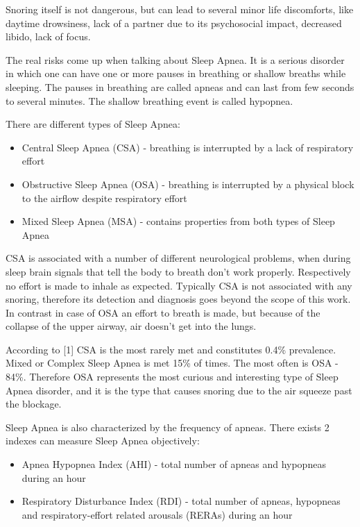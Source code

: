 \documentclass[12pt,a4paper]{report}
\begin{document}
Snoring itself is not dangerous, but can lead to several minor life discomforts, like daytime drowsiness, lack of a partner due to its psychosocial impact, decreased libido, lack of focus.

The real risks come up when talking about Sleep Apnea. It is a serious disorder in which one can have one or more pauses in breathing or shallow breaths while sleeping. The pauses in breathing are called apneas and can last from few seconds to several minutes. The shallow breathing event is called hypopnea. 

There are different types of Sleep Apnea:
\begin{itemize}
 \item Central Sleep Apnea (CSA) - breathing is interrupted by a lack of respiratory effort
 \item Obstructive Sleep Apnea (OSA) - breathing is interrupted by a physical block to the airflow despite respiratory effort
 \item Mixed Sleep Apnea (MSA) - contains properties from both types of Sleep Apnea
\end{itemize}

CSA is associated with a number of different neurological problems, when during sleep brain signals that tell the body to breath don't work properly. Respectively no effort is made to inhale as expected. Typically CSA is not associated with any snoring, therefore its detection and diagnosis goes beyond the scope of this work. In contrast in case of OSA an effort to breath is made, but because of the collapse of the upper airway, air doesn't get into the lungs.

According to [1] CSA is the most rarely met and constitutes 0.4\% prevalence. Mixed or Complex Sleep Apnea is met 15\% of times. The most often is OSA - 84\%. Therefore OSA represents the most curious and interesting type of Sleep Apnea disorder, and it is the type that causes snoring due to the air squeeze past the blockage. 

Sleep Apnea is also characterized by the frequency of apneas. There exists 2 indexes can measure Sleep Apnea objectively: 
\begin{itemize}
 \item Apnea Hypopnea Index (AHI) - total number of apneas and hypopneas during an hour
 \item Respiratory Disturbance Index (RDI) - total number of apneas, hypopneas and respiratory-effort related arousals (RERAs) during an hour
\end{itemize}
\end{document}
